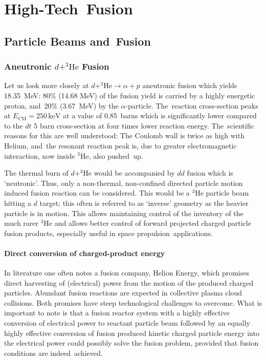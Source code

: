 \documentclass[particles,article,accept,pdftex,moreauthors]{Definitions/mdpi}
\begin{document}
\section{High-Tech~Fusion}\label{sec:newFusion}
\subsection{Particle Beams and~Fusion}\label{ssec:exploreLas}
\subsubsection{Aneutronic \texorpdfstring{{$d+^{3 \!} \mathrm{He}$}}{d+3He} Fusion}\label{sssec:d3Hefuesion}
Let us look more closely at $d+^{3\!}\mathrm{He}\to \alpha+p$ aneutronic fusion which yields 18.35~MeV: 80\% (14.68 MeV) of the fusion yield is carried by a highly energetic proton, and~20\% (3.67~MeV) by the $\alpha$-particle. The~reaction cross-section peaks at $E_\mathrm{CM}=250\,\mathrm{keV}$ at a value of 0.85~barns which is significantly lower compared to the $dt$ 5 barn cross-section at four times lower reaction energy. The~scientific reasons for this are well understood: The Coulomb wall is twice as high with Helium, and~the resonant reaction peak is, due to greater electromagnetic interaction, now inside ${}^3\mathrm{He}$, also pushed~up.

The thermal burn of $d+^{3\!}\mathrm{He}$ would be accompanied by $dd$ fusion which is `neutronic'. Thus, only a non-thermal, non-confined directed particle motion induced fusion reaction can be considered. This would be a ${}^3\mathrm{He}$ particle beam hitting a $d$ target; this often is referred to as `inverse' geometry as the heavier particle is in motion. This allows maintaining control of the inventory of the much rarer ${}^3\mathrm{He}$ and allows better control of forward projected charged particle fusion products, especially useful in space propulsion~applications.

\vspace{-6pt}\paragraph*{\bf Direct conversion of charged-product energy}
In literature one often notes a fusion company, Helion Energy, which promises direct harvesting of (electrical) power from the motion of the produced charged particles. Abundant fusion reactions are expected in collective plasma cloud collisions. Both promises have steep technological challenges to overcome. What is important to note is that a fusion reactor system with a highly effective conversion of electrical power to reactant particle beam followed by an equally highly effective conversion of fusion produced kinetic charged particle energy into the electrical power could possibly solve the fusion problem, provided that fusion conditions are indeed~achieved.
\end{document}
